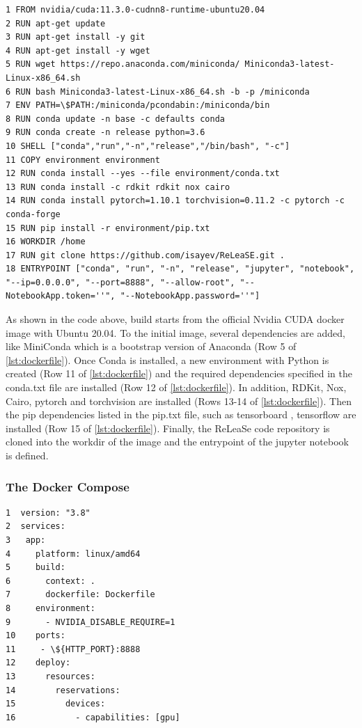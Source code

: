 \documentclass[a4paper]{article}
\begin{document}
\begin{lstlisting}[label={lst:dockerfile}]
1 FROM nvidia/cuda:11.3.0-cudnn8-runtime-ubuntu20.04
2 RUN apt-get update
3 RUN apt-get install -y git
4 RUN apt-get install -y wget
5 RUN wget https://repo.anaconda.com/miniconda/ Miniconda3-latest-Linux-x86_64.sh
6 RUN bash Miniconda3-latest-Linux-x86_64.sh -b -p /miniconda
7 ENV PATH=\$PATH:/miniconda/pcondabin:/miniconda/bin
8 RUN conda update -n base -c defaults conda
9 RUN conda create -n release python=3.6
10 SHELL ["conda","run","-n","release","/bin/bash", "-c"]
11 COPY environment environment
12 RUN conda install --yes --file environment/conda.txt
13 RUN conda install -c rdkit rdkit nox cairo
14 RUN conda install pytorch=1.10.1 torchvision=0.11.2 -c pytorch -c conda-forge
15 RUN pip install -r environment/pip.txt
16 WORKDIR /home
17 RUN git clone https://github.com/isayev/ReLeaSE.git .
18 ENTRYPOINT ["conda", "run", "-n", "release", "jupyter", "notebook", "--ip=0.0.0.0", "--port=8888", "--allow-root", "--NotebookApp.token=''", "--NotebookApp.password=''"]
\end{lstlisting}

As shown in the code above, build starts from the official Nvidia CUDA docker image \cite{nvidia-cuda-docker-image} with Ubuntu 20.04. To the initial image, several dependencies are added, like MiniConda \cite{miniconda} which is a bootstrap version of Anaconda (Row 5 of \ref{lst:dockerfile}).
Once Conda is installed, a new environment with Python is created (Row 11 of \ref{lst:dockerfile}) and the required dependencies specified in the conda.txt file are installed (Row 12 of \ref{lst:dockerfile}). In addition, RDKit, Nox, Cairo, pytorch and torchvision are installed (Rows 13-14 of \ref{lst:dockerfile}). 
Then the pip dependencies listed in the pip.txt file, such as tensorboard \cite{tensorboard}, tensorflow \cite{tensorflow} are installed (Row 15 of \ref{lst:dockerfile}).
Finally, the ReLeaSe code repository is cloned into the workdir of the image and the entrypoint of the jupyter notebook is defined.

\subsubsection{The Docker Compose}\label{sec:The Docker Compose}

\begin{lstlisting}
1  version: "3.8"
2  services:
3   app:
4     platform: linux/amd64
5     build:
6       context: .
7       dockerfile: Dockerfile
8     environment:
9       - NVIDIA_DISABLE_REQUIRE=1
10    ports:
11     - \${HTTP_PORT}:8888
12    deploy:
13      resources:
14        reservations:
15          devices:
16            - capabilities: [gpu]
\end{lstlisting}
\end{document}
